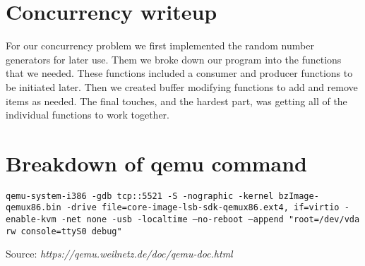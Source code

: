 \documentclass[letterpaper,10pt,titlepage]{article}
\begin{document}
\section*{Concurrency writeup}
\hspace{4ex}For our concurrency problem we first implemented the random number 
generators for later use. Them we broke down our program into the functions that 
we needed. These functions included a consumer and producer functions to be 
initiated later. Then we created buffer modifying functions to add and remove 
items as needed. The final touches, and the hardest part, was getting all of the 
individual functions to work together. 

\section*{Breakdown of qemu command}
\texttt{qemu-system-i386 -gdb tcp::5521 -S -nographic -kernel
bzImage-qemux86.bin -drive file=core-image-lsb-sdk-qemux86.ext4,
if=virtio -enable-kvm -net none -usb -localtime --no-reboot
--append "root=/dev/vda rw console=ttyS0 debug"}

Source:
\textsl{https://qemu.weilnetz.de/doc/qemu-doc.html}
\end{document}
